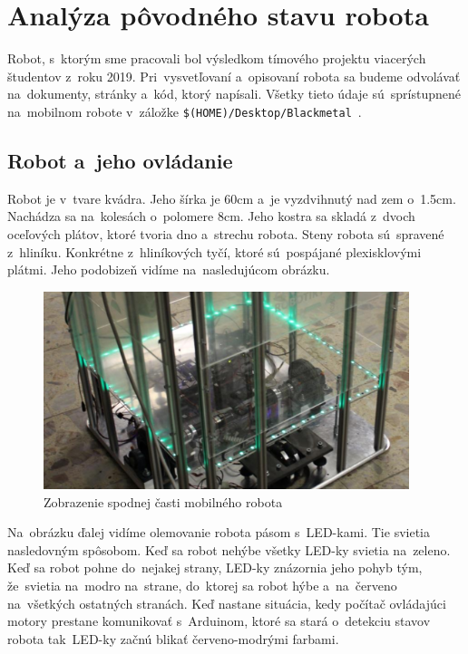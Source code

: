 \section{Analýza pôvodného stavu robota}
\label{sec:formerState}

Robot, s~ktorým sme pracovali bol výsledkom tímového projektu viacerých študentov z~roku 2019. Pri~vysvetľovaní
a~opisovaní robota sa budeme odvolávať na~dokumenty, stránky a~kód, ktorý napísali. Všetky tieto údaje sú~sprístupnené
na~mobilnom robote v~záložke \newline \texttt{\$(HOME)/Desktop/Blackmetal}~\cite{timovyProjekt}.

\subsection{Robot a~jeho ovládanie}
\label{subsec:robotAOvladanie}

Robot je v~tvare kvádra. Jeho šírka je 60cm a~je vyzdvihnutý nad zem o~1.5cm. Nachádza sa na~kolesách o~polomere 8cm.
Jeho kostra sa skladá z~dvoch oceľových plátov, ktoré tvoria dno a~strechu robota. Steny robota sú~spravené z~hliníku.
Konkrétne z~hliníkových tyčí, ktoré sú~pospájané plexisklovými plátmi. Jeho podobizeň vidíme na~nasledujúcom
obrázku.

\begin{figure}[!htbp]
	\begin{center}
		\includegraphics[width=0.95\textwidth]{img/robot.png}
	\end{center}
	\caption{Zobrazenie spodnej časti mobilného robota~\cite{timovyProjekt}}
	\label{fig:robot}
\end{figure}

Na~obrázku ďalej vidíme olemovanie robota pásom s~LED-kami. Tie svietia nasledovným spôsobom. Keď sa robot nehýbe
všetky LED-ky svietia na~zeleno. Keď sa robot pohne do~nejakej strany, LED-ky znázornia jeho pohyb tým, že~svietia
na~modro na~strane, do~ktorej sa robot hýbe a~na~červeno na~všetkých ostatných stranách. Keď nastane situácia,
kedy počítač ovládajúci motory prestane komunikovať s~Arduinom, ktoré sa stará o~detekciu stavov robota
tak~LED-ky začnú blikať červeno-modrými farbami.

